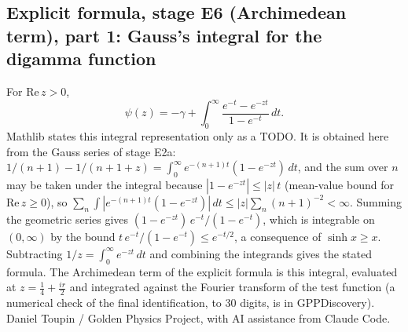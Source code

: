 \documentclass{report}
\theoremstyle{definition}
\begin{document}
\begin{itemize}
\begin{itemize}
\section{Explicit formula, stage E6 (Archimedean term), part 1: Gauss's integral for the digamma function}
For $\mathrm{Re}\,z>0$,
\[
\psi(z)=-\gamma+\int_0^\infty\frac{e^{-t}-e^{-zt}}{1-e^{-t}}\,dt .
\]
Mathlib states this integral representation only as a TODO. It is obtained here from the Gauss series of stage E2a: $1/(n+1)-1/(n+1+z)=\int_0^\infty e^{-(n+1)t}(1-e^{-zt})\,dt$, and the sum over $n$ may be taken under the integral because $|1-e^{-zt}|\le|z|\,t$ (mean-value bound for $\mathrm{Re}\,z\ge0$), so $\sum_n\int|e^{-(n+1)t}(1-e^{-zt})|\,dt\le|z|\sum_n(n+1)^{-2}<\infty$. Summing the geometric series gives $(1-e^{-zt})\,e^{-t}/(1-e^{-t})$, which is integrable on $(0,\infty)$ by the bound $t\,e^{-t}/(1-e^{-t})\le e^{-t/2}$, a consequence of $\sinh x\ge x$. Subtracting $1/z=\int_0^\infty e^{-zt}\,dt$ and combining the integrands gives the stated formula. The Archimedean term of the explicit formula is this integral, evaluated at $z=\tfrac14+\tfrac{ir}2$ and integrated against the Fourier transform of the test function (a numerical check of the final identification, to 30 digits, is in GPPDiscovery).
Daniel Toupin / Golden Physics Project, with AI assistance from Claude Code.



\end{itemize}
\end{itemize}
\end{document}

